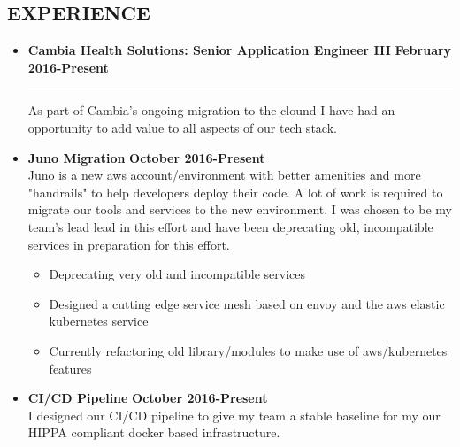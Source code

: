 \documentclass[overlapped]{res}
\begin{document}
\begin{resume}
\section{EXPERIENCE}
\vspace{0.125in}

\begin{itemize}[leftmargin=0in]
    \item[] 
        \textbf{Cambia Health Solutions: Senior Application Engineer III} \hfill \textbf{February 2016-Present} \\[-0.1in] \rule{\textwidth}{0.5pt}
        As part of Cambia's ongoing migration to the clound I have had an opportunity to add value to all aspects of our tech stack.
        \vspace{0.125in}
        \item[] 
            \begin{samepage}
                \textbf{Juno Migration} \hfill \textbf{October 2016-Present} \\
                Juno is a new aws account/environment with better amenities and more "handrails" to help developers deploy their code. 
                A lot of work is required to migrate our tools and services to the new environment. I was chosen to be my team's lead 
                lead in this effort and have been deprecating old, incompatible services in preparation for this effort.
                \begin{itemize}
                    \item[\textbullet] Deprecating very old and incompatible services
                    \item[\textbullet] Designed a cutting edge service mesh based on envoy and the aws elastic kubernetes service
                    \item[\textbullet] Currently refactoring old library/modules to make use of aws/kubernetes features 
                \end{itemize}
            \end{samepage}
            \vspace{0.125in}
        \item[] 
            \begin{samepage}
                \textbf{CI/CD Pipeline} \hfill \textbf{October 2016-Present} \\
                I designed our CI/CD pipeline to give my team a stable baseline for my our HIPPA compliant docker based infrastructure.

\end{samepage}
\end{itemize}
\end{resume}
\end{document}
